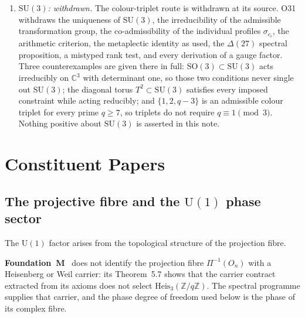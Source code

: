 \documentclass[11pt,a4paper]{article}
\theoremstyle{definition}
\newcommand{\Heis}{\mathrm{Heis}}
\newcommand{\SU}{\mathrm{SU}}
\newcommand{\SO}{\mathrm{SO}}
\newcommand{\UU}{\mathrm{U}}
\begin{document}
\begin{enumerate}
      \item \textit{$\SU(3)$: withdrawn.}
      The colour-triplet route is withdrawn at its source.
      O31~\cite{Beau2026a35} withdraws the uniqueness of $\SU(3)$, the irreducibility of the
      admissible transformation group, the co-admissibility of the individual profiles
      $\sigma_{c_i}$, the arithmetic criterion, the metaplectic identity as used, the
      $\Delta(27)$ spectral proposition, a mistyped rank test, and every derivation of a gauge
      factor.
      Three counterexamples are given there in full: $\SO(3) \subset \SU(3)$ acts irreducibly on
      $\mathbb{C}^3$ with determinant one, so those two conditions never single out $\SU(3)$; the
      diagonal torus $T^2 \subset \SU(3)$ satisfies every imposed constraint while acting
      reducibly; and $\{1, 2, q-3\}$ is an admissible colour triplet for every prime $q \geq 7$,
      so triplets do not require $q \equiv 1 \pmod 3$.
      Nothing positive about $\SU(3)$ is asserted in this note.
    \end{enumerate}

  \section{Constituent Papers}
    \label{sec:papers}

    \subsection{The projective fibre and the \texorpdfstring{$\UU(1)$}{U(1)} phase sector}
      \label{sec:u1}

      The $\UU(1)$ factor arises from the topological structure of the projection fibre.

      \textbf{Foundation~M}~\cite{Beau2026m} does not identify the projection fibre
      $\Pi^{-1}(O_n)$ with a Heisenberg or Weil carrier: its Theorem~5.7 shows that the carrier
      contract extracted from its axioms does not select $\Heis_3(\mathbb{Z}/q\mathbb{Z})$.
      The spectral programme supplies that carrier, and the phase degree of freedom used below is
      the phase of its complex fibre.
\end{document}
